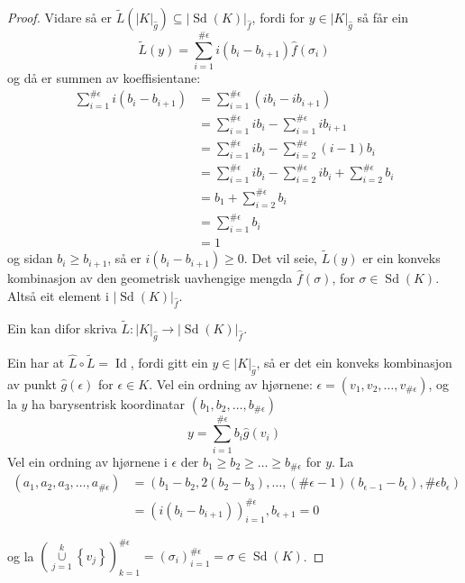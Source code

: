 \documentclass[a4paper, 12pt, norsk]{article}
\theoremstyle{plain}
\theoremstyle{definition}
\newcommand{\union}{ \mathop{\cup}\limits }
\newcommand{\gr}[1]{ \lvert #1 \rvert } %
\newcommand{\set}[1]{ \left\{ #1 \right\} } %
\newcommand{\tuple}[1]{ \left( #1 \right) } %
\DeclareMathOperator{\Sd}{Sd} %
\DeclareMathOperator{\Id}{Id} %
\begin{document}
\begin{proof}
	Vidare så er \( \tilde{L}(\gr{K}_{\hat{g}}) \subseteq \gr{\Sd(K)}_{\hat{f}} \), fordi for \( y \in \gr{K}_{\hat{g}} \) så får ein
	\[
		\tilde{L}(y) = \sum_{i=1}^{\#\epsilon}i\tuple{b_i-b_{i+1}}\hat{f}(\sigma_i)
	\]
	og då er summen av koeffisientane:
	\begin{align*}
		\sum_{i=1}^{\#\epsilon}i\tuple{b_i-b_{i+1}} &= \sum_{i=1}^{\#\epsilon}\tuple{ib_i-ib_{i+1}} \\
		&= \sum_{i=1}^{\#\epsilon}i b_i - \sum_{i=1}^{\#\epsilon}i b_{i+1} \\
		&= \sum_{i=1}^{\#\epsilon}i b_i - \sum_{i=2}^{\#\epsilon}\tuple{i-1}b_{i} \\
		&= \sum_{i=1}^{\#\epsilon}i b_i - \sum_{i=2}^{\#\epsilon}i b_{i} + \sum_{i=2}^{\#\epsilon}b_i \\
		&= b_1 + \sum_{i=2}^{\#\epsilon} b_i \\
		&= \sum_{i=1}^{\#\epsilon} b_i \\
		&= 1
	\end{align*}
	og sidan \( b_i \geq b_{i+1} \), så er \( i\tuple{b_i-b_{i+1}} \geq 0 \). Det vil seie, \( \tilde{L}(y) \) er ein konveks kombinasjon av den geometrisk uavhengige mengda \( \hat{f}(\sigma) \), for \( \sigma \in \Sd(K) \). Altså eit element i \( \gr{\Sd(K)}_{\hat{f}} \).

	Ein kan difor skriva \( \tilde{L}: \gr{K}_{\hat{g}} \to \gr{\Sd(K)}_{\hat{f}} \).

	Ein har at \( \hat{L}\circ\tilde{L} = \Id \), fordi gitt ein \( y \in \gr{K}_{\hat{g}} \), så er det ein konveks kombinasjon av punkt \( \hat{g}(\epsilon) \) for \( \epsilon \in K \). Vel ein ordning av hjørnene: \( \epsilon = (v_1, v_2, \dots, v_{\#\epsilon}) \), og la \( y \) ha barysentrisk koordinatar \( (b_1, b_2, \dots, b_{\#\epsilon}) \)
	\[
		y = \sum_{i = 1}^{\#\epsilon} b_i \hat{g}(v_i)
	\]
	Vel ein ordning av hjørnene i \( \epsilon \) der \( b_1 \geq b_2 \geq \dots \geq b_{\#\epsilon} \) for \( y \). La 
	\begin{align*}
		(a_1, a_2, a_3, \dots, a_{\#\epsilon}) &= \left( b_1-b_2, 2(b_2-b_3), \dots, (\#\epsilon-1)(b_{\epsilon-1}-b_{\epsilon}), \#\epsilon b_{\epsilon} \right) \\
		&= \left( i (b_i-b_{i+1}) \right)_{i=1}^{\#\epsilon}, b_{\epsilon+1} = 0
	\end{align*}
		
	og la \( \left(\union_{j = 1}^{k} \set{v_j} \right)_{k=1}^{\#\epsilon} = (\sigma_i)_{i=1}^{\#\epsilon}=\sigma \in \Sd(K) \).


\end{proof}
\end{document}
